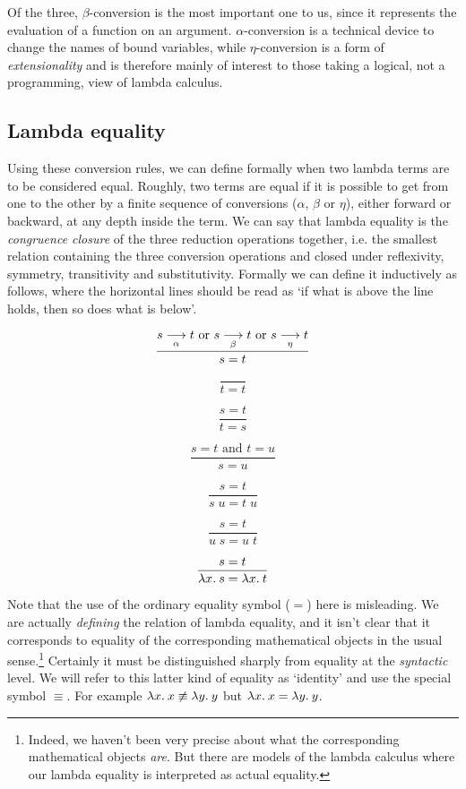 Of the three, $\beta$-conversion is the most important one to us, since it
represents the evaluation of a function on an argument. $\alpha$-conversion is
a technical device to change the names of bound variables, while
$\eta$-conversion is a form of {\em extensionality} and is therefore mainly of
interest to those taking a logical, not a programming, view of lambda calculus.

\subsection{Lambda equality}

Using these conversion rules, we can define formally when two lambda terms are
to be considered equal. Roughly, two terms are equal if it is possible to get
from one to the other by a finite sequence of conversions ($\alpha$, $\beta$ or
$\eta$), either forward or backward, at any depth inside the term. We can say
that lambda equality is the {\em congruence closure} of the three reduction
operations together, i.e. the smallest relation containing the three conversion
operations and closed under reflexivity, symmetry, transitivity and
substitutivity. Formally we can define it inductively as follows, where the
horizontal lines should be read as `if what is above the line holds, then so
does what is below'.

$$ \frac{s \mathrel{\mathop{\longrightarrow}\limits_{\alpha}} t \mbox{ or } s \mathrel{\mathop{\longrightarrow}\limits_{\beta}} t \mbox{ or } s \mathrel{\mathop{\longrightarrow}\limits_{\eta}} t}{s = t} $$

$$ \frac{}{t = t} $$

$$ \frac{s = t}{t = s} $$

$$ \frac{s = t \mbox{ and } t = u}{s = u} $$

$$ \frac{s = t}{s\; u = t\; u} $$

$$ \frac{s = t}{u\; s = u\; t} $$

$$ \frac{s = t}{\lambda x.\: s = \lambda x.\: t}$$

Note that the use of the ordinary equality symbol ($=$) here is misleading. We
are actually {\em defining} the relation of lambda equality, and it isn't clear
that it corresponds to equality of the corresponding mathematical objects in
the usual sense.\footnote{Indeed, we haven't been very precise about what the
corresponding mathematical objects {\em are}. But there are models of the
lambda calculus where our lambda equality is interpreted as actual equality.}
Certainly it must be distinguished sharply from equality at the {\em syntactic}
level. We will refer to this latter kind of equality as `identity' and use the
special symbol $\equiv$. For example $\lambda x.\: x \not\equiv \lambda y.\: y$ but
$\lambda x.\: x = \lambda y.\: y$.

